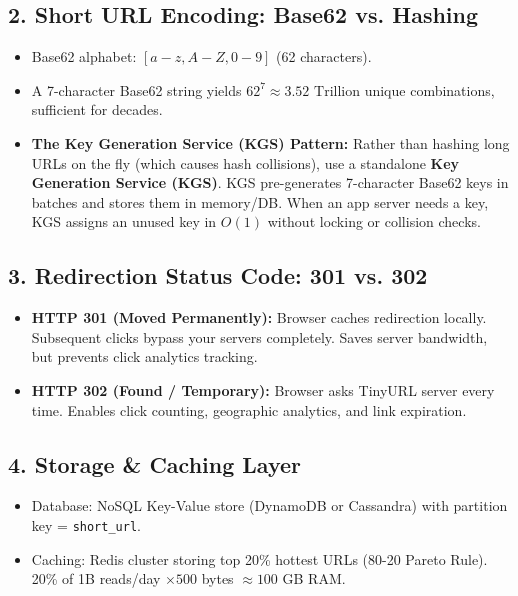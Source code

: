 \documentclass[10pt,journal,compsoc,onecolumn]{IEEEtran}
\begin{document}
\subsection{2. Short URL Encoding: Base62 vs. Hashing}
\begin{itemize}
    \item Base62 alphabet: $[a-z, A-Z, 0-9]$ (62 characters).
    \item A 7-character Base62 string yields $62^7 \approx 3.52 \text{ Trillion}$ unique combinations, sufficient for decades.
    \item \textbf{The Key Generation Service (KGS) Pattern:} Rather than hashing long URLs on the fly (which causes hash collisions), use a standalone \textbf{Key Generation Service (KGS)}. KGS pre-generates 7-character Base62 keys in batches and stores them in memory/DB. When an app server needs a key, KGS assigns an unused key in $O(1)$ without locking or collision checks.
\end{itemize}

\subsection{3. Redirection Status Code: 301 vs. 302}
\begin{itemize}
    \item \textbf{HTTP 301 (Moved Permanently):} Browser caches redirection locally. Subsequent clicks bypass your servers completely. Saves server bandwidth, but prevents click analytics tracking.
    \item \textbf{HTTP 302 (Found / Temporary):} Browser asks TinyURL server every time. Enables click counting, geographic analytics, and link expiration.
\end{itemize}

\subsection{4. Storage \& Caching Layer}
\begin{itemize}
    \item Database: NoSQL Key-Value store (DynamoDB or Cassandra) with partition key = \texttt{short\_url}.
    \item Caching: Redis cluster storing top 20\% hottest URLs (80-20 Pareto Rule). 20\% of 1B reads/day $\times 500$ bytes $\approx 100$ GB RAM.
\end{itemize}

\end{document}
